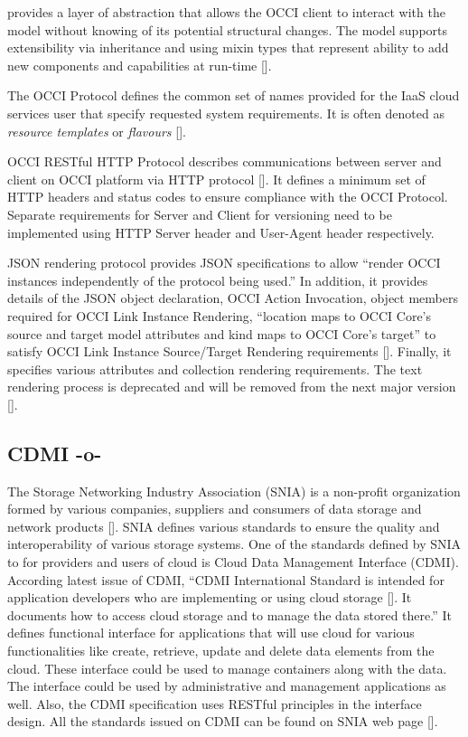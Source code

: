 provides a layer of abstraction that allows the OCCI client to
interact with the model without knowing of its potential structural
changes. The model supports extensibility via inheritance and using
mixin types that represent ability to add new components and
capabilities at run-time [\cite{nyren-edmonds-papaspyrou-2016}].

The OCCI Protocol defines the common set of names provided for the
IaaS cloud services user that specify requested system
requirements. It is often denoted as \textit{resource templates} or
\textit{flavours} [\cite{drescher-parak-wallom-2015}].

OCCI RESTful HTTP Protocol describes communications between server and
client on OCCI platform via HTTP protocol
[\cite{nyren-edmonds-metsch-2016}]. It defines a minimum set of HTTP
headers and status codes to ensure compliance with the OCCI
Protocol. Separate requirements for Server and Client for versioning
need to be implemented using HTTP Server header and User-Agent header
respectively.

JSON rendering protocol provides JSON specifications to allow ``render
OCCI instances independently of the protocol being used.'' In
addition, it provides details of the JSON object declaration, OCCI
Action Invocation, object members required for OCCI Link Instance
Rendering, ``location maps to OCCI Core's source and target model
attributes and kind maps to OCCI Core's target'' to satisfy OCCI Link
Instance Source/Target Rendering requirements
[\cite{nyren-feldhaus-parak-2016}].  Finally, it specifies various
attributes and collection rendering requirements.  The text rendering
process is deprecated and will be removed from the next major version
[\cite{edmonds-metsch-2016}].


   
\subsection{CDMI -o-}

The Storage Networking Industry Association (SNIA) is a non-profit
organization formed by various companies, suppliers and consumers of
data storage and network products [\cite{www-sniawebsite}]. SNIA defines
various standards to ensure the quality and interoperability of
various storage systems. One of the standards defined by SNIA to for
providers and users of cloud is Cloud Data Management Interface
(CDMI). According latest issue of CDMI, ``CDMI International Standard
is intended for application developers who are implementing or using
cloud storage [\cite{cdmi-manual}]. It documents how to access cloud
storage and to manage the data stored there.'' It defines functional
interface for applications that will use cloud for various
functionalities like create, retrieve, update and delete data elements
from the cloud. These interface could be used to manage containers
along with the data. The interface could be used by administrative and
management applications as well. Also, the CDMI specification uses
RESTful principles in the interface design. All the standards issued
on CDMI can be found on SNIA web page [\cite{www-cdmiwebsite}].




